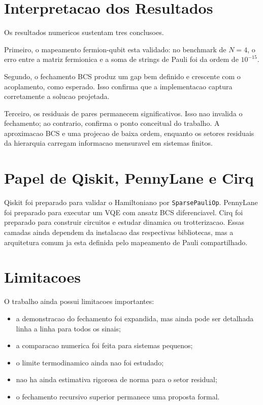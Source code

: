 \documentclass[11pt,a4paper]{article}
\begin{document}
\section{Interpretacao dos Resultados}

Os resultados numericos sustentam tres conclusoes.

Primeiro, o mapeamento fermion-qubit esta validado: no benchmark de \(N=4\), o erro entre a matriz fermionica e a soma de strings de Pauli foi da ordem de \(10^{-15}\).

Segundo, o fechamento BCS produz um gap bem definido e crescente com o acoplamento, como esperado. Isso confirma que a implementacao captura corretamente a solucao projetada.

Terceiro, os residuais de pares permanecem significativos. Isso nao invalida o fechamento; ao contrario, confirma o ponto conceitual do trabalho. A aproximacao BCS e uma projecao de baixa ordem, enquanto os setores residuais da hierarquia carregam informacao mensuravel em sistemas finitos.

\section{Papel de Qiskit, PennyLane e Cirq}

Qiskit foi preparado para validar o Hamiltoniano por \texttt{SparsePauliOp}. PennyLane foi preparado para executar um VQE com ansatz BCS diferenciavel. Cirq foi preparado para construir circuitos e estudar dinamica ou trotterizacao. Essas camadas ainda dependem da instalacao das respectivas bibliotecas, mas a arquitetura comum ja esta definida pelo mapeamento de Pauli compartilhado.

\section{Limitacoes}

O trabalho ainda possui limitacoes importantes:

\begin{itemize}
\item a demonstracao do fechamento foi expandida, mas ainda pode ser detalhada linha a linha para todos os sinais;
\item a comparacao numerica foi feita para sistemas pequenos;
\item o limite termodinamico ainda nao foi estudado;
\item nao ha ainda estimativa rigorosa de norma para o setor residual;
\item o fechamento recursivo superior permanece uma proposta formal.
\end{itemize}
\end{document}
